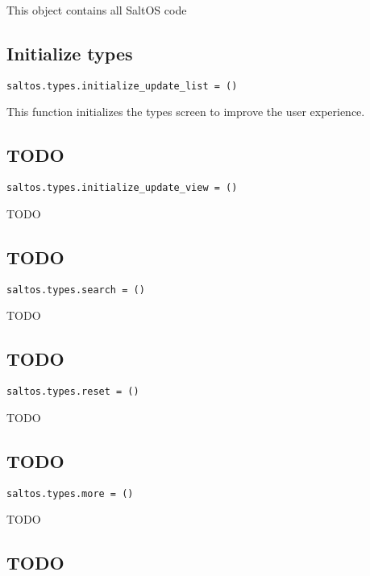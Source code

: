 \documentclass[a4paper]{book}
\begin{document}
This object contains all SaltOS code

\hypertarget{toc121}{}
\subsection{Initialize types}

\begin{lstlisting}
saltos.types.initialize_update_list = ()
\end{lstlisting}

This function initializes the types screen to improve the user experience.

\hypertarget{toc122}{}
\subsection{TODO}

\begin{lstlisting}
saltos.types.initialize_update_view = ()
\end{lstlisting}

TODO

\hypertarget{toc123}{}
\subsection{TODO}

\begin{lstlisting}
saltos.types.search = ()
\end{lstlisting}

TODO

\hypertarget{toc124}{}
\subsection{TODO}

\begin{lstlisting}
saltos.types.reset = ()
\end{lstlisting}

TODO

\hypertarget{toc125}{}
\subsection{TODO}

\begin{lstlisting}
saltos.types.more = ()
\end{lstlisting}

TODO

\hypertarget{toc126}{}
\subsection{TODO}
\end{document}
